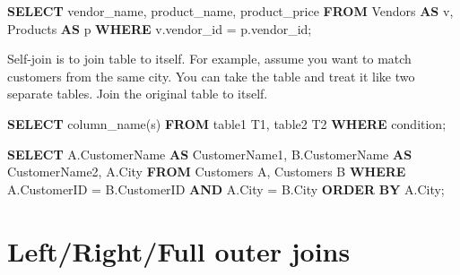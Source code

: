 \documentclass[]{book}
\newenvironment{Shaded}{\begin{snugshade}}{\end{snugshade}}
\newcommand{\KeywordTok}[1]{\textcolor[rgb]{0.13,0.29,0.53}{\textbf{{#1}}}}
\newcommand{\NormalTok}[1]{{#1}}
\theoremstyle{definition}
\theoremstyle{definition}
\theoremstyle{remark}
\begin{document}
\begin{Shaded}
\begin{Highlighting}[]
\KeywordTok{SELECT} \NormalTok{vendor_name, product_name, product_price}
\KeywordTok{FROM} \NormalTok{Vendors }\KeywordTok{AS} \NormalTok{v, Products }\KeywordTok{AS} \NormalTok{p}
\KeywordTok{WHERE} \NormalTok{v.vendor_id = p.vendor_id;}
\end{Highlighting}
\end{Shaded}

Self-join is to join table to itself. For example, assume you want to
match customers from the same city. You can take the table and treat it
like two separate tables. Join the original table to itself.

\begin{Shaded}
\begin{Highlighting}[]
\KeywordTok{SELECT} \NormalTok{column_name(s)}
\KeywordTok{FROM} \NormalTok{table1 T1, table2 T2 }
\KeywordTok{WHERE} \NormalTok{condition;}
\end{Highlighting}
\end{Shaded}

\begin{Shaded}
\begin{Highlighting}[]
\KeywordTok{SELECT} \NormalTok{A.CustomerName }\KeywordTok{AS} \NormalTok{CustomerName1, B.CustomerName }\KeywordTok{AS} \NormalTok{CustomerName2, A.City}
\KeywordTok{FROM} \NormalTok{Customers A, Customers B}
\KeywordTok{WHERE} \NormalTok{A.CustomerID = B.CustomerID}
\KeywordTok{AND} \NormalTok{A.City = B.City}
\KeywordTok{ORDER} \KeywordTok{BY} \NormalTok{A.City;}
\end{Highlighting}
\end{Shaded}

\section{Left/Right/Full outer joins}\label{leftrightfull-outer-joins}



\backmatter
\printindex
\end{document}
